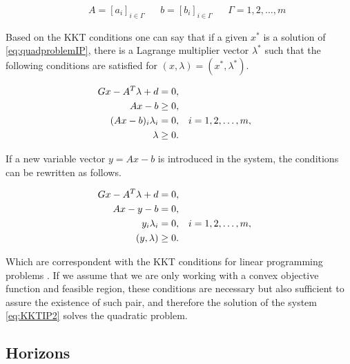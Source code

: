 \begin{itemize}
\begin{equation*}
 \begin{aligned}
 & & A = [a_i]_{i\in \Gamma} & & b = [b_i]_{i\in \Gamma} & & \Gamma = {1, 2, \ldots , m} 
 \end{aligned}
\end{equation*}

Based on the KKT conditions one can say that if a given $x^*$ is a solution of \ref{eq:quadproblemIP}, there is a Lagrange multiplier vector $\lambda^*$ such that the following conditions are satisfied for $(x, \lambda) = (x^*, \lambda^*)$.

\begin{equation} \label{eq:KKTIP}
 \begin{subequations}
 \begin{aligned}
  Gx - A^{T}\lambda + d &= 0, \\
  Ax - b &\geq 0, \\ 
  (Ax - b)_{i}\lambda_{i} &= 0, && i = 1, 2, \ldots , m, \\
  \lambda &\geq 0. 
 \end{aligned}
 \end{subequations}
\end{equation}

If a new variable vector $y = Ax - b$ is introduced in the system, the conditions can be rewritten as follows.

\begin{equation} \label{eq:KKTIP2}
 \begin{subequations}
 \begin{aligned}
  Gx - A^{T}\lambda + d &= 0, \\
  Ax - y - b &= 0, \\ 
  y_{i}\lambda_{i} &= 0, && i = 1, 2, \ldots , m, \\
  (y, \lambda) &\geq 0. 
 \end{aligned}
 \end{subequations}
\end{equation}

Which are correspondent with the KKT conditions for linear programming problems \cite{ref:Nocedal&Wright2006}. If we assume that we are only working with a convex objective function and feasible region, these conditions are necessary but also sufficient to assure the existence of such pair, and therefore the solution of the system \ref{eq:KKTIP2} solves the quadratic problem.





\end{itemize}

\subsection{Horizons}
